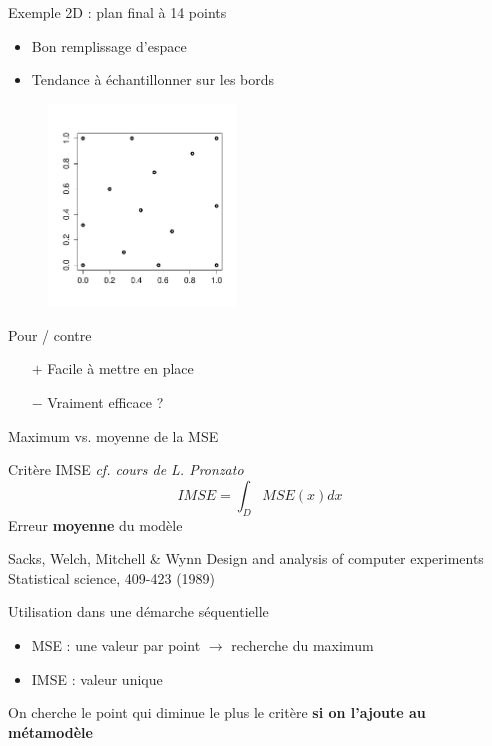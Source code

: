 \begin{frame}{Exemple 2D : plan final à 14 points}
\begin{itemize}
	\item Bon remplissage d'espace
	\item Tendance à échantillonner sur les bords
\end{itemize}

\begin{figure}
	\centering
	\includegraphics[trim=0mm 17mm 0mm 20mm,width=50mm, clip]{mse/maxMSE14.pdf}
\end{figure}

\begin{exampleblock}{Pour / contre}
 \begin{itemize}
	\item[$+$] Facile à mettre en place
	\item[$-$] Vraiment efficace ?
\end{itemize}
\end{exampleblock}
\end{frame}
\begin{frame}{Maximum vs. moyenne de la MSE}
\begin{block}{Critère IMSE \textit{cf. cours de L. Pronzato}}
 $$IMSE = \int_D MSE(x)dx$$
 Erreur \textbf{moyenne} du modèle
\end{block}

\scriptsize{
 \begin{thebibliography}{1}
\beamertemplatearticlebibitems
Sacks, Welch, Mitchell \& Wynn
  \newblock Design and analysis of computer experiments
  \newblock Statistical science, 409-423 (1989)
 \end{thebibliography}}

 \normalsize
\begin{exampleblock}{Utilisation dans une démarche séquentielle}
\begin{itemize}
 \item MSE : une valeur par point $\rightarrow$ recherche du maximum
 \item IMSE : valeur unique
\end{itemize}
On cherche le point qui diminue le plus le critère \textbf{si on l'ajoute au métamodèle}
\end{exampleblock}
\end{frame}
